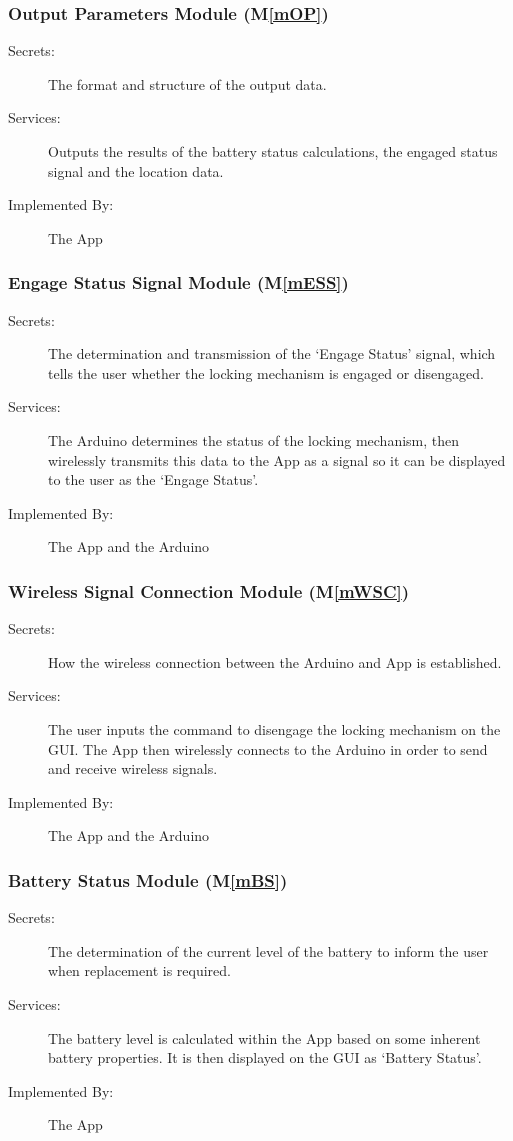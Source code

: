 \documentclass[12pt, titlepage]{article}
\newcommand{\mref}[1]{M\ref{#1}}
\begin{document}
\subsubsection{Output Parameters Module (\mref{mOP})}
\begin{description}
\item[Secrets:]The format and structure of the output data.
\item[Services:]Outputs the results of the battery status calculations, the engaged status signal and the location data. 
\item[Implemented By:]The App
\end{description}

\subsubsection{Engage Status Signal Module (\mref{mESS})}
\begin{description}
\item[Secrets:]The determination and transmission of the ‘Engage Status’ signal, which tells the user whether the locking mechanism is engaged or disengaged.
\item[Services:]The Arduino determines the status of the locking mechanism, then wirelessly transmits this data to the App as a signal so it can be displayed to the user as the ‘Engage Status’.
\item[Implemented By:]The App and the Arduino
\end{description}

\subsubsection{Wireless Signal Connection Module (\mref{mWSC})}
\begin{description}
\item[Secrets:]How the wireless connection between the Arduino and App is established.
\item[Services:]The user inputs the command to disengage the locking mechanism on the GUI. The App then wirelessly connects to the Arduino in order to send and receive wireless signals.
\item[Implemented By:]The App and the Arduino
\end{description}

\subsubsection{Battery Status Module (\mref{mBS})}
\begin{description}
\item[Secrets:]The determination of the current level of the battery to inform the user when replacement is required.
\item[Services:]The battery level is calculated within the App based on some inherent battery properties. It is then displayed on the GUI as ‘Battery Status’. 
\item[Implemented By:]The App
\end{description}
\end{document}

